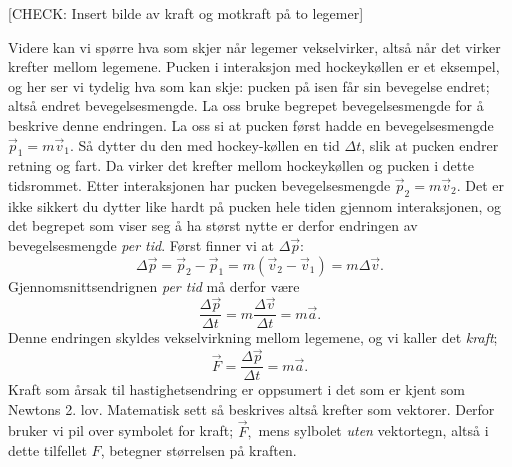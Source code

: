 
[CHECK: Insert bilde av kraft og motkraft på to legemer]

Videre kan vi spørre hva som skjer når legemer vekselvirker, altså når det virker krefter mellom legemene. Pucken i interaksjon med hockeykøllen er et eksempel, og her ser vi tydelig hva som kan skje: pucken på isen får sin bevegelse endret; altså endret bevegelsesmengde. La oss bruke begrepet bevegelsesmengde for å beskrive denne endringen. La oss si at pucken først hadde en bevegelsesmengde
\(\vec{p}_1=m\vec{v}_1\). Så dytter du den med hockey-køllen en tid $\Delta t$, slik at pucken endrer retning og fart. Da virker det krefter mellom hockeykøllen og pucken i dette tidsrommet. Etter interaksjonen har pucken bevegelsesmengde \(\vec{p}_2=m\vec{v}_2\). Det er ikke sikkert du dytter like hardt på pucken hele tiden gjennom interaksjonen, og det begrepet som viser seg å ha størst nytte er derfor endringen av bevegelsesmengde \textit{per tid}. Først finner vi at  $\Delta \vec{p}$:
\[\Delta \vec{p} = \vec{p}_2 - \vec{p}_1=m(\vec{v}_2 - \vec{v}_1)=m\Delta\vec{v}.\]
Gjennomsnittsendrignen \textit{per tid} må derfor være 
\[\frac{\Delta \vec{p}}{\Delta t} = m\frac{\Delta\vec{v}}{\Delta t}=m\vec{a}.\]
Denne endringen skyldes vekselvirkning mellom legemene, og vi kaller det \textit{kraft};
\[\vec{F}=\frac{\Delta \vec{p}}{\Delta t}= m\vec{a}.\]
Kraft som årsak til hastighetsendring er oppsumert i det som er kjent som Newtons 2. lov.
\defn{Kraft som endring av bevegelse}{%
Dersom et legeme blir påvirket av én eller flere krefter vil legemet akselerere i retning av  resultant-kraften $\sum\vec{F};$
\begin{align}
\Sigma\vec{F} = m \cdot\vec{a}\qquad \textbf{(Newtons 2. lov)}.
\end{align}
Fra denne sammenhengen ser vi at enheten for kraft, Newton (N) kan uttrykkes som \[\textrm{N}=\textrm{kg}\cdot\frac{\textrm{m}}{\textrm{s}^2}\]
}
Matematisk sett så beskrives altså krefter som vektorer. Derfor bruker vi pil over symbolet for kraft; $\vec{F},$ mens sylbolet \textit{uten} vektortegn, altså i dette tilfellet $F$, betegner størrelsen på kraften.

